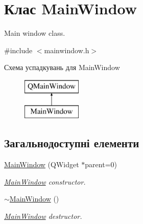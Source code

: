 \hypertarget{classMainWindow}{\section{Клас Main\-Window}
\label{classMainWindow}
}


Main window class.  




{\ttfamily \#include $<$mainwindow.\-h$>$}

Схема успадкувань для Main\-Window\begin{figure}[H]
\begin{center}
\leavevmode
\includegraphics[height=2.000000cm]{classMainWindow}
\end{center}
\end{figure}
\subsection*{Загальнодоступні елементи}
\begin{DoxyCompactItemize}
\item 
\hyperlink{classMainWindow_a8b244be8b7b7db1b08de2a2acb9409db}{Main\-Window} (Q\-Widget $\ast$parent=0)
\begin{DoxyCompactList}\small\item\em \hyperlink{classMainWindow}{Main\-Window} constructor. \end{DoxyCompactList}\item 
\hypertarget{classMainWindow_ae98d00a93bc118200eeef9f9bba1dba7}{\hyperlink{classMainWindow_ae98d00a93bc118200eeef9f9bba1dba7}{$\sim$\-Main\-Window} ()}\label{classMainWindow_ae98d00a93bc118200eeef9f9bba1dba7}

\begin{DoxyCompactList}\small\item\em \hyperlink{classMainWindow}{Main\-Window} destructor. \end{DoxyCompactList}\end{DoxyCompactItemize}
